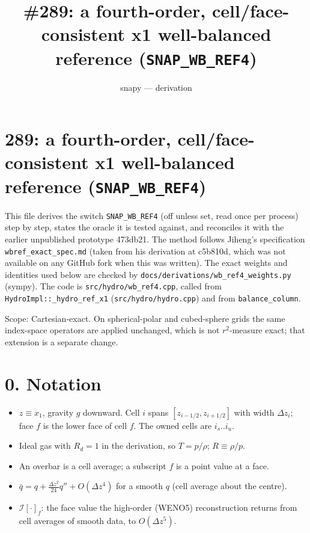 \documentclass[11pt,a4paper]{article}
\title{\#289: a fourth-order, cell/face-consistent x1 well-balanced reference (\texttt{SNAP\_WB\_REF4})}
\author{snapy --- derivation}\date{}
\begin{document}
\maketitle
\section*{289: a fourth-order, cell/face-consistent x1 well-balanced reference (\texttt{SNAP\_WB\_REF4})}

This file derives the switch \texttt{SNAP\_WB\_REF4} (off unless set, read once per process) step by step, states
the oracle it is tested against, and reconciles it with the earlier unpublished prototype 473db21. The method
follows Jiheng's specification \texttt{wbref\_exact\_spec.md} (taken from his derivation at c5b810d, which was not
available on any GitHub fork when this was written). The exact weights and identities used below are checked
by \texttt{docs/derivations/wb\_ref4\_weights.py} (sympy). The code is \texttt{src/hydro/wb\_ref4.cpp}, called from
\texttt{HydroImpl::\_hydro\_ref\_x1} (\texttt{src/hydro/hydro.cpp}) and from \texttt{balance\_column}.

Scope: Cartesian-exact. On spherical-polar and cubed-sphere grids the same index-space operators are applied
unchanged, which is not $r^2$-measure exact; that extension is a separate change.

\section*{0. Notation}

\begin{itemize}
\item $z \equiv x_1$, gravity $g$ downward. Cell $i$ spans $[z_{i-1/2}, z_{i+1/2}]$ with width $\Delta z_i$; face $f$
  is the lower face of cell $f$. The owned cells are $i_s..i_u$.
\item Ideal gas with $R_d = 1$ in the derivation, so $T = p/\rho$; $R \equiv \rho/p$.
\item An overbar is a cell average; a subscript $f$ is a point value at a face.
\item $\bar q = q + \tfrac{\Delta z^2}{24} q'' + O(\Delta z^4)$ for a smooth $q$ (cell average about the centre).
\item $\mathcal I[\cdot]_f$: the face value the high-order (WENO5) reconstruction returns from cell averages of
  smooth data, to $O(\Delta z^5)$.
\end{itemize}
\end{document}
